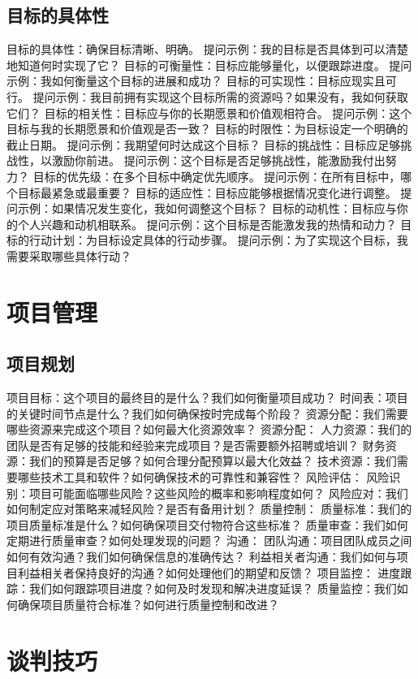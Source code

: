 \documentclass[12pt]{book}
\begin{document}
\subsection{目标的具体性}
目标的具体性：确保目标清晰、明确。
提问示例：我的目标是否具体到可以清楚地知道何时实现了它？
目标的可衡量性：目标应能够量化，以便跟踪进度。
提问示例：我如何衡量这个目标的进展和成功？
目标的可实现性：目标应现实且可行。
提问示例：我目前拥有实现这个目标所需的资源吗？如果没有，我如何获取它们？
目标的相关性：目标应与你的长期愿景和价值观相符合。
提问示例：这个目标与我的长期愿景和价值观是否一致？
目标的时限性：为目标设定一个明确的截止日期。
提问示例：我期望何时达成这个目标？
目标的挑战性：目标应足够挑战性，以激励你前进。
提问示例：这个目标是否足够挑战性，能激励我付出努力？
目标的优先级：在多个目标中确定优先顺序。
提问示例：在所有目标中，哪个目标最紧急或最重要？
目标的适应性：目标应能够根据情况变化进行调整。
提问示例：如果情况发生变化，我如何调整这个目标？
目标的动机性：目标应与你的个人兴趣和动机相联系。
提问示例：这个目标是否能激发我的热情和动力？
目标的行动计划：为目标设定具体的行动步骤。
提问示例：为了实现这个目标，我需要采取哪些具体行动？


\section{项目管理}
\subsection{项目规划}
项目目标：这个项目的最终目的是什么？我们如何衡量项目成功？
时间表：项目的关键时间节点是什么？我们如何确保按时完成每个阶段？
资源分配：我们需要哪些资源来完成这个项目？如何最大化资源效率？
资源分配：
人力资源：我们的团队是否有足够的技能和经验来完成项目？是否需要额外招聘或培训？
财务资源：我们的预算是否足够？如何合理分配预算以最大化效益？
技术资源：我们需要哪些技术工具和软件？如何确保技术的可靠性和兼容性？
风险评估：
风险识别：项目可能面临哪些风险？这些风险的概率和影响程度如何？
风险应对：我们如何制定应对策略来减轻风险？是否有备用计划？
质量控制：
质量标准：我们的项目质量标准是什么？如何确保项目交付物符合这些标准？
质量审查：我们如何定期进行质量审查？如何处理发现的问题？
沟通：
团队沟通：项目团队成员之间如何有效沟通？我们如何确保信息的准确传达？
利益相关者沟通：我们如何与项目利益相关者保持良好的沟通？如何处理他们的期望和反馈？
项目监控：
进度跟踪：我们如何跟踪项目进度？如何及时发现和解决进度延误？
质量监控：我们如何确保项目质量符合标准？如何进行质量控制和改进？


\section{谈判技巧}
\end{document}
